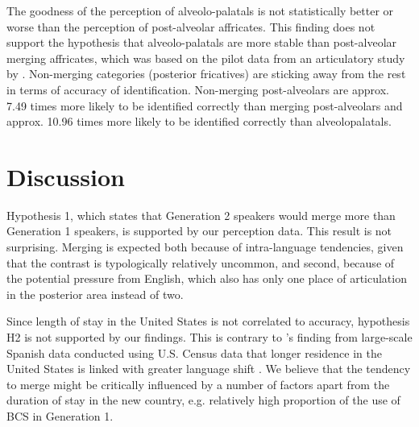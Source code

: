 \documentclass[output=paper,modfonts,newtxmath,hidelinks,]{langscibook}
\begin{document}
The goodness of the perception of alveolo-palatals is not statistically better or worse than the perception of post-alveolar affricates. This finding does not support the hypothesis that alveolo-palatals are more stable than post-alveolar merging affricates, which was based on the pilot data from an articulatory study by \citet{Cavar-etal2016}. Non-merging categories (posterior fricatives) are sticking away from the rest in terms of accuracy of identification. Non-merging post-alveolars are approx. 7.49 times more likely to be identified correctly than merging post-alveolars and approx. 10.96 times more likely to be identified correctly than alveolopalatals.



\section{Discussion}\label{sec:mihajlovic:6}

Hypothesis 1, which states that Generation 2 speakers would merge more than Generation 1 speakers, is supported by our perception data. This result is not surprising. Merging is expected both because of intra-language tendencies, given that the contrast is typologically relatively uncommon, and second, because of the potential pressure from English, which also has only one place of articulation in the posterior area instead of two.



Since length of stay in the United States is not correlated to accuracy, hypothesis H2 is not supported by our findings. This is contrary to \citeauthor{Veltman2000}’s finding from large-scale Spanish data conducted using U.S. Census data that longer residence in the United States is linked with greater language shift \citep[66]{Veltman2000}. We believe that the tendency to merge might be critically influenced by a number of factors apart from the duration of stay in the new country, e.g. relatively high proportion of the use of BCS in Generation 1.
\end{document}
